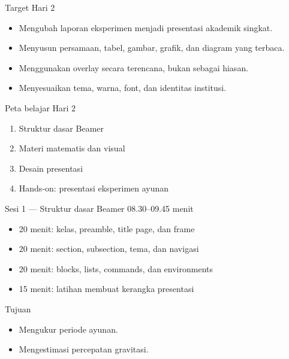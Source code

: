 \documentclass[aspectratio=169,11pt]{beamer}
\begin{document}
\begin{frame}{Target Hari 2}
  \begin{itemize}
    \item Mengubah laporan eksperimen menjadi presentasi akademik singkat.
    \item Menyusun persamaan, tabel, gambar, grafik, dan diagram yang terbaca.
    \item Menggunakan overlay secara terencana, bukan sebagai hiasan.
    \item Menyesuaikan tema, warna, font, dan identitas institusi.
  \end{itemize}
  \end{frame}
\begin{frame}{Peta belajar Hari 2}
  \begin{enumerate}
    \item Struktur dasar Beamer
    \item Materi matematis dan visual
    \item Desain presentasi
    \item Hands-on: presentasi eksperimen ayunan
  \end{enumerate}
  \end{frame}

\begin{frame}{Sesi 1 --- Struktur dasar Beamer}
\large 08.30--09.45  menit
\medskip
\begin{itemize}
  \item 20 menit: kelas, preamble, title page, dan frame
  \item 20 menit: section, subsection, tema, dan navigasi
  \item 20 menit: blocks, lists, commands, dan environments
  \item 15 menit: latihan membuat kerangka presentasi
\end{itemize}
\end{frame}
\begin{frame}{Tujuan}
  \begin{itemize}
    \item Mengukur periode ayunan.
    \item Mengestimasi percepatan gravitasi.
  \end{itemize}
  \end{frame} %
\end{document}
